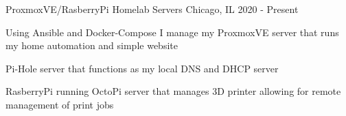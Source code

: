 

\begin{cventries}

	\cventry
	{ProxmoxVE/RasberryPi} %
	{Homelab Servers} %
	{Chicago, IL} %
	{2020 - Present} %
	{
		\begin{cvitems} %
			\item {Using Ansible and Docker-Compose I manage my ProxmoxVE server that runs my home automation and simple website}
			\item {Pi-Hole server that functions as my local DNS and DHCP server}
			\item {RasberryPi running OctoPi server that manages 3D printer allowing for remote management of print jobs}
		\end{cvitems}
	}

\end{cventries}
